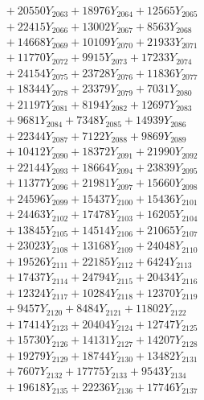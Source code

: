 \documentclass[a4paper,10pt]{article}
\begin{document}
{\begin{align}
&\;  + 20550 Y_{2063} + 18976 Y_{2064} + 12565 Y_{2065} \\[0.3ex]
&\;  + 22415 Y_{2066} + 13002 Y_{2067} + 8563 Y_{2068} \\[0.5ex]\allowbreak
&\;  + 14668 Y_{2069} + 10109 Y_{2070} + 21933 Y_{2071} \\[0.3ex]
&\;  + 11770 Y_{2072} + 9915 Y_{2073} + 17233 Y_{2074} \\[0.3ex]
&\;  + 24154 Y_{2075} + 23728 Y_{2076} + 11836 Y_{2077} \\[0.3ex]
&\;  + 18344 Y_{2078} + 23379 Y_{2079} + 7031 Y_{2080} \\[0.3ex]
&\;  + 21197 Y_{2081} + 8194 Y_{2082} + 12697 Y_{2083} \\[0.3ex]
&\;  + 9681 Y_{2084} + 7348 Y_{2085} + 14939 Y_{2086} \\[0.3ex]
&\;  + 22344 Y_{2087} + 7122 Y_{2088} + 9869 Y_{2089} \\[0.3ex]
&\;  + 10412 Y_{2090} + 18372 Y_{2091} + 21990 Y_{2092} \\[0.3ex]
&\;  + 22144 Y_{2093} + 18664 Y_{2094} + 23839 Y_{2095} \\[0.3ex]
&\;  + 11377 Y_{2096} + 21981 Y_{2097} + 15660 Y_{2098} \\[0.5ex]\allowbreak
&\;  + 24596 Y_{2099} + 15437 Y_{2100} + 15436 Y_{2101} \\[0.3ex]
&\;  + 24463 Y_{2102} + 17478 Y_{2103} + 16205 Y_{2104} \\[0.3ex]
&\;  + 13845 Y_{2105} + 14514 Y_{2106} + 21065 Y_{2107} \\[0.3ex]
&\;  + 23023 Y_{2108} + 13168 Y_{2109} + 24048 Y_{2110} \\[0.3ex]
&\;  + 19526 Y_{2111} + 22185 Y_{2112} + 6424 Y_{2113} \\[0.3ex]
&\;  + 17437 Y_{2114} + 24794 Y_{2115} + 20434 Y_{2116} \\[0.3ex]
&\;  + 12324 Y_{2117} + 10284 Y_{2118} + 12370 Y_{2119} \\[0.3ex]
&\;  + 9457 Y_{2120} + 8484 Y_{2121} + 11802 Y_{2122} \\[0.3ex]
&\;  + 17414 Y_{2123} + 20404 Y_{2124} + 12747 Y_{2125} \\[0.3ex]
&\;  + 15730 Y_{2126} + 14131 Y_{2127} + 14207 Y_{2128} \\[0.5ex]\allowbreak
&\;  + 19279 Y_{2129} + 18744 Y_{2130} + 13482 Y_{2131} \\[0.3ex]
&\;  + 7607 Y_{2132} + 17775 Y_{2133} + 9543 Y_{2134} \\[0.3ex]
&\;  + 19618 Y_{2135} + 22236 Y_{2136} + 17746 Y_{2137} \\[0.3ex]

\end{align}}
\end{document}
